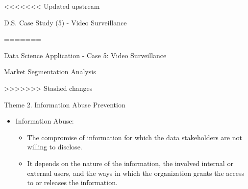 \documentclass[
 size=14pt,
 paper=smartboard,  %
 mode=present, 		%
 display=slides, 	%
 style=tuliplab,  	%
 pauseslide,
 fleqn,leqno]{powerdot}
\begin{document}
<<<<<<< Updated upstream
\begin{slide}[toc=,bm=]{D.S. Case Study (5) - Video Surveillance}
\begin{figure}[ht]
\end{figure}
=======
\begin{slide}[toc=,bm=]{Data Science Application - Case 5: Video Surveillance}


\end{slide}


\begin{slide}[toc=,bm=]{Market Segmentation Analysis}

>>>>>>> Stashed changes

\end{slide}

\begin{slide}{Theme 2. Information Abuse Prevention}
\begin{itemize}
\item
Information Abuse:


\begin{itemize}
\item
The compromise of information
for which the data stakeholders are not willing to disclose.


\item
It depends on the nature of the information,
the involved internal or external users,
and the ways in which the organization grants the access to
or releases the information.

\end{itemize}
\end{itemize}

\end{slide}



\end{slide}
\end{document}
